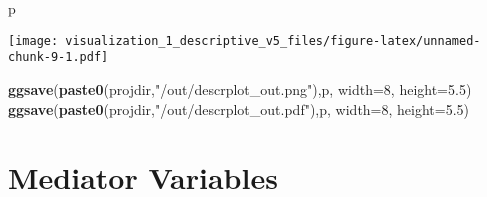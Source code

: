 \documentclass[
]{article}
\newenvironment{Shaded}{\begin{snugshade}}{\end{snugshade}}
\newcommand{\DataTypeTok}[1]{\textcolor[rgb]{0.13,0.29,0.53}{#1}}
\newcommand{\DecValTok}[1]{\textcolor[rgb]{0.00,0.00,0.81}{#1}}
\newcommand{\FloatTok}[1]{\textcolor[rgb]{0.00,0.00,0.81}{#1}}
\newcommand{\KeywordTok}[1]{\textcolor[rgb]{0.13,0.29,0.53}{\textbf{#1}}}
\newcommand{\NormalTok}[1]{#1}
\newcommand{\StringTok}[1]{\textcolor[rgb]{0.31,0.60,0.02}{#1}}
\begin{document}
\begin{Shaded}
\begin{Highlighting}[]
\NormalTok{p}
\end{Highlighting}
\end{Shaded}

\texttt{[image: visualization\_1\_descriptive\_v5\_files/figure-latex/unnamed-chunk-9-1.pdf]}

\begin{Shaded}
\begin{Highlighting}[]
\KeywordTok{ggsave}\NormalTok{(}\KeywordTok{paste0}\NormalTok{(projdir,}\StringTok{"/out/descrplot_out.png"}\NormalTok{),p, }\DataTypeTok{width=}\DecValTok{8}\NormalTok{, }\DataTypeTok{height=}\FloatTok{5.5}\NormalTok{)}
\KeywordTok{ggsave}\NormalTok{(}\KeywordTok{paste0}\NormalTok{(projdir,}\StringTok{"/out/descrplot_out.pdf"}\NormalTok{),p, }\DataTypeTok{width=}\DecValTok{8}\NormalTok{, }\DataTypeTok{height=}\FloatTok{5.5}\NormalTok{)}
\end{Highlighting}
\end{Shaded}

\hypertarget{mediator-variables}{%
\section{Mediator Variables}\label{mediator-variables}}
\end{document}
